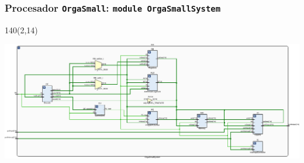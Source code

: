 \documentclass[aspectratio=169]{beamer}
\begin{document}
\begin{frame}[fragile,t]
    \frametitle{Procesador \texttt{OrgaSmall}: \texttt{module OrgaSmallSystem}}
    \begin{textblock}{140}(2,14)
    \begin{center}
    \includegraphics[scale=0.84]{pdf/schematic-crop.pdf}
    \end{center}
    \end{textblock}
\end{frame}
\end{document}
